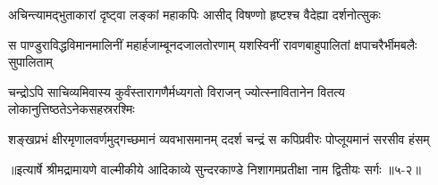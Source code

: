\twolineshloka
{अचिन्त्यामद्भुताकारां दृष्ट्वा लङ्कां महाकपिः}
{आसीद् विषण्णो हृष्टश्च वैदेह्या दर्शनोत्सुकः} %

\twolineshloka
{स पाण्डुराविद्धविमानमालिनीं महार्हजाम्बूनदजालतोरणाम्}
{यशस्विनीं रावणबाहुपालितां क्षपाचरैर्भीमबलैः सुपालिताम्} %

\twolineshloka
{चन्द्रोऽपि साचिव्यमिवास्य कुर्वंस्तारागणैर्मध्यगतो विराजन्}
{ज्योत्स्नावितानेन वितत्य लोकानुत्तिष्ठतेऽनेकसहस्ररश्मिः} %

\twolineshloka
{शङ्खप्रभं क्षीरमृणालवर्णमुद्गच्छमानं व्यवभासमानम्}
{ददर्श चन्द्रं स कपिप्रवीरः पोप्लूयमानं सरसीव हंसम्} %


॥इत्यार्षे श्रीमद्रामायणे वाल्मीकीये आदिकाव्ये सुन्दरकाण्डे निशागमप्रतीक्षा नाम द्वितीयः सर्गः ॥५-२॥

